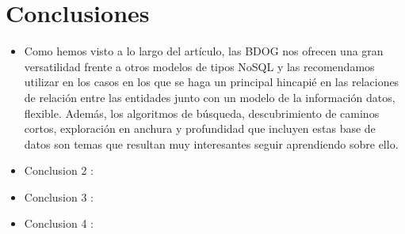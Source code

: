 \documentclass[preprint,12pt]{elsarticle}
\begin{document}



\section{Conclusiones}

\begin{itemize}

\item Como hemos visto a lo largo del artículo, las BDOG nos ofrecen una gran versatilidad frente a otros modelos de tipos NoSQL y las recomendamos utilizar en los casos en los que se haga un principal hincapié en las relaciones de relación entre las entidades junto con un modelo de la información datos, flexible. Además, los algoritmos de búsqueda, descubrimiento de caminos cortos, exploración en anchura y profundidad que incluyen estas base de datos son temas que resultan muy interesantes seguir aprendiendo sobre ello.\\

\item Conclusion 2 : \\ 

\item Conclusion 3 : \\ 

\item Conclusion 4 : \\ 
\end{itemize}


	
	\newpage
	
		 
	
	
\end{document}
